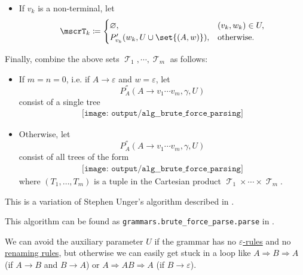 \begin{algorithm}
\begin{thmenum}
\begin{itemize}
      \item If \( v_k \) is a non-terminal, let
      \begin{equation*}
        \mscrT_k \coloneqq \begin{cases}
          \varnothing,                          &(v_k, w_k) \in U, \\
          P'_{v_k}(w_k, U \cup \set{ (A, w) }), &\T{otherwise.}
        \end{cases}
      \end{equation*}
    \end{itemize}

     Finally, combine the above sets \( \mscrT_1, \cdots, \mscrT_m \) as follows:
    \begin{itemize}
      \item If \( m = n = 0 \), i.e. if \( A \to \varepsilon \) and \( w = \varepsilon \), let
      \begin{equation*}
        P^\dprime_A(A \to v_1 \cdots v_m, \gamma, U)
      \end{equation*}
      consist of a single tree
      \begin{equation*}
        \begin{aligned}
          \texttt{[image: output/alg\_\_brute\_force\_parsing]}
        \end{aligned}
      \end{equation*}

      \item Otherwise, let
      \begin{equation*}
        P^\dprime_A(A \to v_1 \cdots v_m, \gamma, U)
      \end{equation*}
      consist of all trees of the form
      \begin{equation*}
        \begin{aligned}
          \texttt{[image: output/alg\_\_brute\_force\_parsing]}
        \end{aligned}
      \end{equation*}
      where \( (T_1, \ldots, T_m) \) is a tuple in the Cartesian product \( \mscrT_1 \times \cdots \times \mscrT_m \).
    \end{itemize}
  \end{thmenum}
\end{algorithm}
\begin{comments}
  \item This is a variation of Stephen Unger's algorithm described in \cite{Unger1968}.
  \item This algorithm can be found as \texttt{grammars.brute\_force\_parse.parse} in \cite{code}.
  \item We can avoid the auxiliary parameter \( U \) if the grammar has no \hyperref[def:epsilon_free_grammar]{\( \varepsilon \)-rules} and no \hyperref[alg:renaming_rule_collapse]{renaming rules}, but otherwise we can easily get stuck in a loop like \( A \Rightarrow B \Rightarrow A \) (if \( A \to B \) and \( B \to A \)) or \( A \Rightarrow AB \Rightarrow A \) (if \( B \to \varepsilon \)).
\end{comments}

